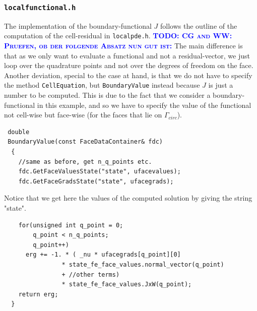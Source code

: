 \documentclass[smallextended]{svjour3}       %
\numberwithin{equation}{section}
\newcommand{\todo}[1]{\textbf{\textsc{\textcolor{blue}{TODO: #1}}}}
\begin{document}
\subsubsection{\texttt{localfunctional.h}}
The implementation of the boundary-functional $J$ follows the outline of the
computation of the cell-residual in \texttt{localpde.h}. 
\todo{CG and WW: Pruefen, ob der folgende Absatz nun gut ist:}
The main difference is that as we only want to evaluate a functional and not a
residual-vector, we just loop over the quadrature points and not over the
degrees of freedom on the face. Another deviation, special to the case at
hand, is that we do not have to specify the method \texttt{CellEquation}, but
\texttt{BoundaryValue} instead because $J$ is just a number to be computed. This is due to the fact that we consider a boundary-functional in this example, and so we have to specify the value of the functional not cell-wise but face-wise (for the faces that lie on $\Gamma_{circ}$). 



\begin{lstlisting}
 double
 BoundaryValue(const FaceDataContainer& fdc)
  {
    //same as before, get n_q_points etc.
    fdc.GetFaceValuesState("state", ufacevalues);
    fdc.GetFaceGradsState("state", ufacegrads);
\end{lstlisting}
Notice that we get here the values of the computed solution by giving the string "state".
\begin{lstlisting}
    for(unsigned int q_point = 0; 
        q_point < n_q_points; 
        q_point++)
      erg += -1. * ( _nu * ufacegrads[q_point][0]
                * state_fe_face_values.normal_vector(q_point)
                + //other terms)        
                * state_fe_face_values.JxW(q_point);
    return erg;
  }
\end{lstlisting}
\end{document}
